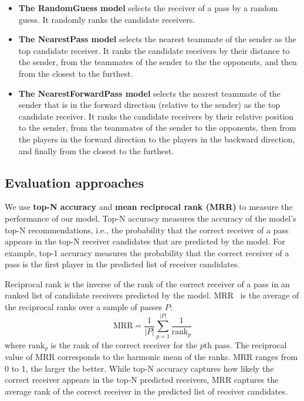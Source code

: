 \begin{itemize}
	\item \textbf{The RandomGuess model} selects the receiver of a pass by a random guess. It randomly ranks the candidate receivers.
	\item \textbf{The NearestPass model} selects the nearest teammate of the sender as the top candidate receiver. It ranks the candidate receivers by their distance to the sender, from the teammates of the sender to the the opponents, and then from the closest to the furthest.
	\item \textbf{The NearestForwardPass model} selects the nearest teammate of the sender that is in the forward direction (relative to the sender) as the top candidate receiver. It ranks the candidate receivers by their relative position to the sender, from the teammates of the sender to the opponents, then from the players in the forward direction to the players in the backward direction, and finally from the closest to the furthest.
\end{itemize}

\subsection{Evaluation approaches}\label{evaluation-approach}

We use \textbf{top-N accuracy} and \textbf{mean reciprocal rank (MRR)} to measure the performance of our model.
Top-N accuracy measures the accuracy of the model's top-N recommendations, i.e., the probability that the correct receiver of a pass appears in the top-N receiver candidates that are predicted by the model.
For example, top-1 accuracy measures the probability that the correct receiver of a pass is the first player in the predicted list of receiver candidates.

Reciprocal rank is the inverse of the rank of the correct receiver of a pass in an ranked list of candidate receivers predicted by the model.
MRR~\cite{Craswell2009} is the average of the reciprocal ranks over a sample of passes $P$:
\begin{equation}
  \textrm{MRR} = \frac{1}{|P|}\displaystyle\sum_{p=1}^{|P|}\frac{1}{\textrm{rank}_p}
\end{equation}
where $\textrm{rank}_p$ is the rank of the correct receiver for the $p$th pass.
The reciprocal value of MRR corresponds to the harmonic mean of the ranks.
MRR ranges from 0 to 1, the larger the better. 
While top-N accuracy captures how likely the correct receiver appears in the top-N predicted receivers, 
MRR captures the average rank of the correct receiver in the predicted list of receiver candidates.

